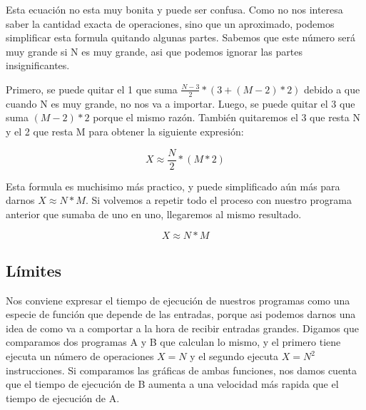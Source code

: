 \documentclass{article}
\begin{document}
Esta ecuación no esta muy bonita y puede ser confusa. Como no nos interesa saber la cantidad exacta de operaciones, sino que un aproximado, podemos simplificar esta formula quitando algunas partes. Sabemos que este número será muy grande si N es muy grande, asi que podemos ignorar las partes insignificantes.

Primero, se puede quitar el 1 que suma $\frac{N - 3}{2} * (3 + (M - 2) * 2)$ debido a que cuando N es muy grande, no nos va a importar. Luego, se puede quitar el 3 que suma $(M - 2) * 2$ porque el mismo razón. También quitaremos el 3 que resta N y el 2 que resta M para obtener la siguiente expresión:

\begin{equation}
    X \approx \frac{N}{2} * (M * 2)
\end{equation}

Esta formula es muchisimo más practico, y puede simplificado aún más para darnos $X \approx N * M$. Si volvemos a repetir todo el proceso con nuestro programa anterior que sumaba de uno en uno, llegaremos al mismo resultado.

\begin{equation}
    X \approx N * M
\end{equation}

\subsection{Límites}

Nos conviene expresar el tiempo de ejecución de nuestros programas como una especie de función que depende de las entradas, porque asi podemos darnos una idea de como va a comportar a la hora de recibir entradas grandes. Digamos que comparamos dos programas A y B que calculan lo mismo, y el primero tiene ejecuta un número de operaciones $X = N$ y el segundo ejecuta $X = N^2$ instrucciones. Si comparamos las gráficas de ambas funciones, nos damos cuenta que el tiempo de ejecución de B aumenta a una velocidad más rapida que el tiempo de ejecución de A.
\end{document}
